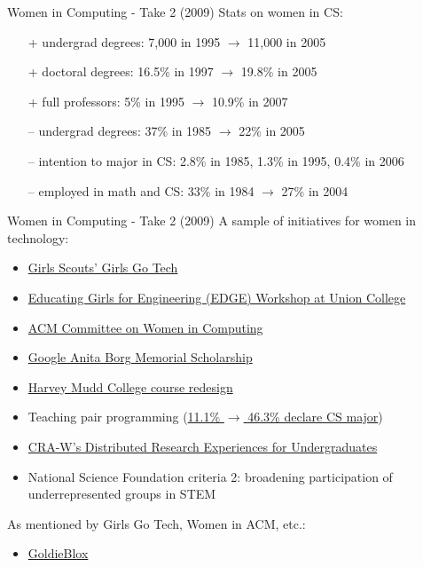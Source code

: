 \documentclass{beamer}
\begin{document}
\begin{frame}{Women in Computing - Take 2 (2009)}
Stats on women in CS:
\begin{itemize}
\item[+] undergrad degrees: 7,000 in 1995 $\rightarrow$ 11,000 in 2005
\item[+] doctoral degrees: 16.5\% in 1997 $\rightarrow$ 19.8\% in 2005
\item[+] full professors: 5\% in 1995 $\rightarrow$ 10.9\% in 2007
\pause
\item[--] undergrad degrees: 37\% in 1985 $\rightarrow$ 22\% in 2005
\item[--] intention to major in CS: 2.8\% in 1985, 1.3\% in 1995, 0.4\% in 2006
\item[--] employed in math and CS: 33\% in 1984 $\rightarrow$ 27\% in 2004
\end{itemize}
\end{frame}

\begin{frame}{Women in Computing - Take 2 (2009)}
A sample of initiatives for women in technology:
\begin{itemize}
\item \href{http://vimeo.com/73735417}{Girls Scouts' Girls Go Tech} %
\item \href{http://engineering.union.edu/edge/}{Educating Girls for Engineering (EDGE) Workshop at Union College}
\item \href{http://women.acm.org/}{ACM Committee on Women in Computing}
\item \href{http://www.google.com/anitaborg/}{Google Anita Borg Memorial Scholarship}
\item \href{http://dx.doi.org/10.1145/1734263.1734281}{Harvey Mudd College course redesign}
\item Teaching pair programming (\href{http://cacm.acm.org/magazines/2006/8/5850/fulltext}{11.1\% $\rightarrow$ 46.3\% declare CS major})
\item \href{http://cra-w.org/dreu}{CRA-W's Distributed Research Experiences for Undergraduates}
\item National Science Foundation criteria 2: broadening participation of underrepresented groups in STEM
\end{itemize}
\bigskip
As mentioned by Girls Go Tech, Women in ACM, etc.:
\begin{itemize}
\item \href{http://www.youtube.com/watch?v=y-AtZfNU3zw}{GoldieBlox}
\end{itemize}
\end{frame}
\end{document}
